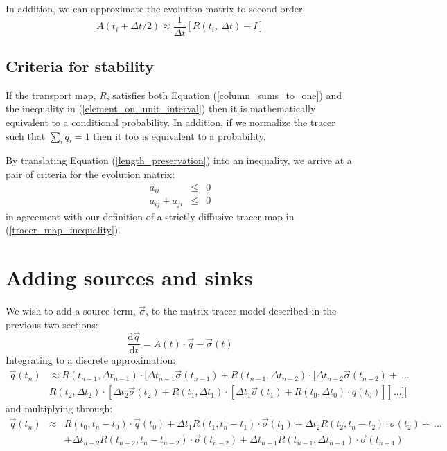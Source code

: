 \documentclass[11pt]{article}
\begin{document}
In addition, we can approximate the evolution matrix to second order:
\begin{equation}
A(t_i+\Delta t/2) \approx \frac{1}{\Delta t} \left [R(t_i,~\Delta t) - I \right ]
\end{equation}

\subsection{Criteria for stability}

If the transport map, $R$, satisfies both Equation (\ref{column_sums_to_one})
and the inequality in (\ref{element_on_unit_interval}) then it is mathematically
equivalent to a conditional probability.
In addition, if we normalize the tracer such that $\sum_i q_i=1$
then it too is equivalent to a probability.

By translating Equation (\ref{length_preservation}) into an inequality, 
we arrive at a pair of criteria for the evolution matrix:
\begin{eqnarray}
a_{ii} & \le & 0 \\
a_{ij}+a_{ji} & \le & 0
\end{eqnarray}
in agreement with our definition of a strictly diffusive tracer map in
(\ref{tracer_map_inequality}).


\section{Adding sources and sinks}

We wish to add a source term, $\vec \sigma$, to the matrix tracer model
described in the previous two sections:
\begin{equation}
\frac{\mathrm d \vec q}{\mathrm d t} = A(t) \cdot \vec q + \vec \sigma(t)
\end{equation}
Integrating to a discrete approximation:
\begin{eqnarray}
\vec q(t_n) & \approx R(t_{n-1}, \Delta t_{n-1}) \cdot [\Delta t_{n-1}\vec \sigma(t_{n-1})+R(t_{n-1}, \Delta t_{n-2}) 
\cdot [\Delta t_{n-2} \vec \sigma(t_{n-2})+~...\nonumber \\
& R(t_2, \Delta t_2) \cdot [\Delta t_2 \vec \sigma(t_2) +
R(t_1, \Delta t_1) \cdot [\Delta t_1 \vec \sigma(t_1) + R(t_0, \Delta t_0) \cdot q(t_0) ]]...]]
\end{eqnarray}
and multiplying through:
\begin{eqnarray}
\vec q(t_n) & \approx & R(t_0,t_n-t_0) \cdot \vec q(t_0) + \Delta t_1 R(t_1,t_n-t_1) \cdot \vec \sigma(t_1) +
\Delta t_2 R(t_2, t_n-t_2) \cdot \sigma(t_2) + ~...\nonumber \\ 
& & + \Delta t_{n-2} R(t_{n-2},t_n-t_{n-2}) \cdot \vec\sigma(t_{n-2}) + 
\Delta t_{n-1} R(t_{n-1},\Delta t_{n-1}) \cdot \vec \sigma(t_{n-1})
\end{eqnarray}



\end{document}
